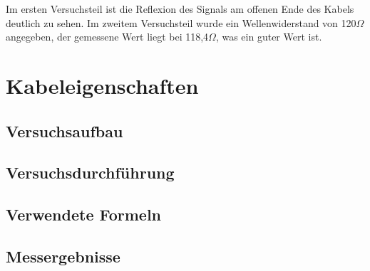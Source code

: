 \documentclass[12pt,a4paper]{article}
\begin{document}
Im ersten Versuchsteil ist die Reflexion des Signals am offenen Ende des Kabels deutlich zu sehen. Im zweitem Versuchsteil wurde ein Wellenwiderstand von 120$\Omega$ angegeben, der gemessene Wert liegt bei 118,4$\Omega$, was ein guter Wert ist.


\section{Kabeleigenschaften}
\subsection{Versuchsaufbau}
\subsection{Versuchsdurchführung}
\subsection{Verwendete Formeln}
\subsection{Messergebnisse}
\end{document}
